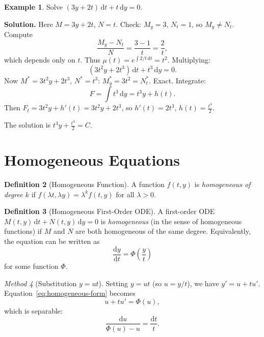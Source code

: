 \documentclass[12pt,a4paper,openany]{book}
\theoremstyle{definition}
\newtheorem{definition}{Definition}[chapter]
\newtheorem{example}[definition]{Example}
\theoremstyle{plain}
\theoremstyle{remark}
\newtheorem{method}[definition]{Method}
\newcommand{\dd}{\mathrm{d}}
\begin{document}
\begin{example}
\label{ex:integrating-factor-exact}
Solve $(3y + 2t)\,\dd t + t\,\dd y = 0$.

\textbf{Solution.} Here $M = 3y+2t$, $N = t$. Check: $M_y = 3$, $N_t = 1$, so $M_y \ne N_t$. Compute
\[
  \frac{M_y - N_t}{N} = \frac{3 - 1}{t} = \frac{2}{t},
\]
which depends only on $t$. Thus $\mu(t) = e^{\int 2/t\,\dd t} = t^2$. Multiplying:
\[
  (3t^2 y + 2t^3)\,\dd t + t^3\,\dd y = 0.
\]
Now $M^* = 3t^2 y + 2t^3$, $N^* = t^3$: $M^*_y = 3t^2 = N^*_t$. Exact. Integrate:
\[
  F = \int t^3\,\dd y = t^3 y + h(t).
\]
Then $F_t = 3t^2 y + h'(t) = 3t^2 y + 2t^3$, so $h'(t) = 2t^3$, $h(t) = \frac{t^4}{2}$.

The solution is $t^3 y + \frac{t^4}{2} = C$.
\end{example}

\section{Homogeneous Equations}
\label{sec:homogeneous-first-order}

\begin{definition}[Homogeneous Function]
\label{def:homogeneous-function}
A function $f(t,y)$ is \emph{homogeneous of degree $k$} if $f(\lambda t, \lambda y) = \lambda^k f(t,y)$ for all $\lambda > 0$.
\end{definition}

\begin{definition}[Homogeneous First-Order ODE]
\label{def:homogeneous-ode}
A first-order ODE $M(t,y)\,\dd t + N(t,y)\,\dd y = 0$ is \emph{homogeneous} (in the sense of homogeneous functions) if $M$ and $N$ are both homogeneous of the same degree. Equivalently, the equation can be written as
\begin{equation}\label{eq:homogeneous-form}
  \frac{\dd y}{\dd t} = \Phi\!\left(\frac{y}{t}\right)
\end{equation}
for some function $\Phi$.
\end{definition}

\begin{method}[Substitution $y = ut$]
\label{meth:homogeneous-sub}
Setting $y = ut$ (so $u = y/t$), we have $y' = u + tu'$. Equation~\eqref{eq:homogeneous-form} becomes
\[
  u + tu' = \Phi(u),
\]
which is separable:
\[
  \frac{\dd u}{\Phi(u)-u} = \frac{\dd t}{t}.
\]
\end{method}
\end{document}
